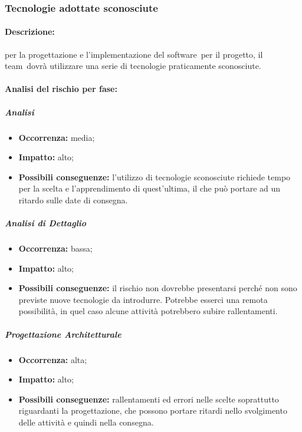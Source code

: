 \documentclass[../PianoProgetto.tex]{subfiles}
\begin{document}
\subsubsection{Tecnologie adottate sconosciute}
\label{sec:Tecnologie adottate sconosciute}

	\paragraph*{Descrizione:} per la progettazione e l'implementazione del software\g\ per il progetto, il team\g\ dovrà utilizzare una serie di tecnologie praticamente sconosciute.
	
	\paragraph*{Analisi del rischio per fase:} 

		\subparagraph*{Analisi}
			\begin{itemize}[label={-}]
				\item \textbf{Occorrenza:} media;
				\item \textbf{Impatto:} alto;
				\item \textbf{Possibili conseguenze:} l'utilizzo di tecnologie sconosciute richiede tempo per la scelta e l'apprendimento di quest'ultima, il che può portare ad un ritardo sulle date di consegna.
			\end{itemize}
			
		\subparagraph*{Analisi di Dettaglio}
			\begin{itemize}[label={-}]
				\item \textbf{Occorrenza:} bassa;
				\item \textbf{Impatto:} alto;
				\item \textbf{Possibili conseguenze:} il rischio non dovrebbe presentarsi perché non sono previste nuove tecnologie da introdurre. Potrebbe esserci una remota possibilità, in quel caso alcune attività potrebbero subire rallentamenti.
			\end{itemize}
			
		\subparagraph*{Progettazione Architetturale}
			\begin{itemize}[label={-}]
				\item \textbf{Occorrenza:} alta;
				\item \textbf{Impatto:} alto;
				\item \textbf{Possibili conseguenze:} rallentamenti ed errori nelle scelte soprattutto riguardanti la progettazione, che possono portare ritardi nello svolgimento delle attività e quindi nella consegna.
			\end{itemize}
			
\end{document}

